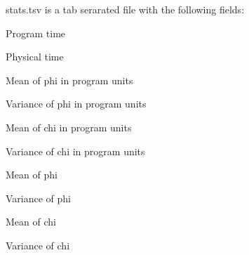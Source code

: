 stats.tsv is a tab serarated file with the following fields:

\begin{DoxyItemize}
\item Program time \item Physical time \item Mean of phi in program units \item Variance of phi in program units \item Mean of chi in program units \item Variance of chi in program units \item Mean of phi \item Variance of phi \item Mean of chi \item Variance of chi \end{DoxyItemize}
